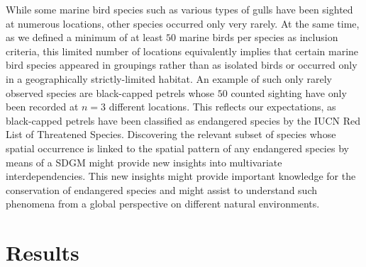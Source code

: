 \documentclass{statsoc}\usepackage[]{graphicx}\usepackage[]{color}
\begin{document}
While some marine bird species such as various types of gulls have been sighted at numerous locations, other species occurred only very rarely. At the same time, as we defined a minimum of at least $50$ marine birds per species as inclusion criteria, this limited number of locations equivalently implies that certain marine bird species appeared in groupings rather than as isolated birds or occurred only in a geographically strictly-limited habitat. An example of such only rarely observed species are black-capped petrels whose $50$ counted sighting have only been recorded at $n=3$ different locations. This reflects our expectations, as black-capped petrels have been classified as endangered species by the IUCN Red List of Threatened Species. Discovering the relevant subset of species whose spatial occurrence is linked to the spatial pattern of any endangered species  by means of a SDGM might provide new insights into multivariate interdependencies.  This new insights might provide important knowledge for the conservation of endangered species and might assist to understand such phenomena from a global perspective on different natural environments.    

\section{Results}
\end{document}
